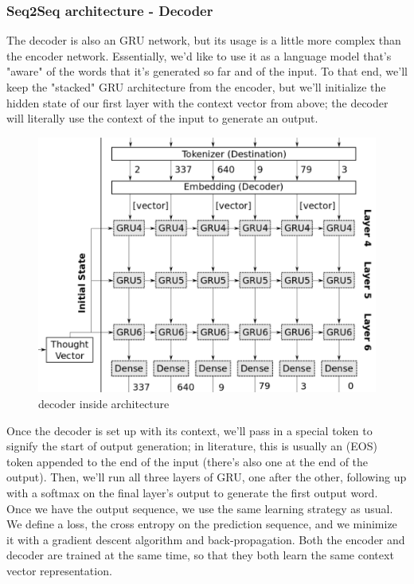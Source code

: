 \subsubsection{Seq2Seq architecture - Decoder}
The decoder is also an GRU network, but its usage is a little more complex than the encoder network. Essentially, we’d like to use it as a language model that’s "aware" of the words that it’s generated
so far and of the input. To that end, we’ll keep the "stacked" GRU
architecture from the encoder, but we’ll initialize the hidden state of
our first layer with the context vector from above; the decoder will
literally use the context of the input to generate an output.
\begin{figure}[H]%
    \center%
    \includegraphics[width=.8\textwidth]{images/amir/dec.png}%
    \caption[This is a decoder image]{ decoder inside architecture \cite{web018}
    }\label{fig:decoder}%
  \end{figure}
Once the decoder is set up with its context, we’ll pass in a special
token to signify the start of output generation; in literature, this is
usually an (EOS) token appended to the end of the input (there’s
also one at the end of the output).
Then, we’ll run all three layers of
GRU, one after the other, following up with a softmax on the final
layer’s output to generate the first output word.\\
Once we have the output sequence, we use the same learning strategy
as usual. We define a loss, the cross entropy on the prediction
sequence, and we minimize it with a gradient descent algorithm and
back-propagation. Both the encoder and decoder are trained at the
same time, so that they both learn the same context vector representation.
